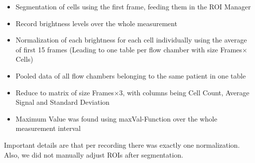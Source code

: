 \begin{itemize}
	\item Segmentation of cells using the first frame, feeding them in the ROI Manager
	\item Record brightness levels over the whole measurement
	\item Normalization of each brightness for each cell individually using the average of first 15 frames (Leading to one table per flow chamber with size Frames$\times$Cells)
	\item Pooled data of all flow chambers belonging to the same patient in one table
	\item Reduce to matrix of size Frames$\times$3, with columns being Cell Count, Average Signal and Standard Deviation
	\item Maximum Value was found using maxVal-Function over the whole measurement interval
\end{itemize}

Important details are that per recording there was exactly one normalization. Also, we did not manually adjust ROIs after segmentation. 



